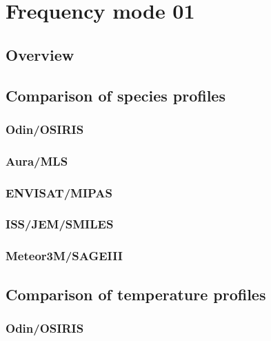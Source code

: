 \section{Frequency mode 01}
\label{sec:fm01}

\subsection{Overview}
\label{sec:fm01:overview}

\subsection{Comparison of species profiles}
\label{sec:fm01:comparison:species}

\subsubsection{Odin/OSIRIS}
\label{sec:fm01:comparison:species:osiris}

\subsubsection{Aura/MLS}
\label{sec:fm01:comparison:species:mls}

\subsubsection{ENVISAT/MIPAS}
\label{sec:fm01:comparison:species:mipas}

\subsubsection{ISS/JEM/SMILES}
\label{sec:fm01:comparison:species:smiles}

\subsubsection{Meteor3M/SAGEIII}
\label{sec:fm01:comparison:species:sage3}


\subsection{Comparison of temperature profiles}
\label{sec:fm01:comparison:temperature}

\subsubsection{Odin/OSIRIS}
\label{sec:fm01:comparison:temperature:osiris}

